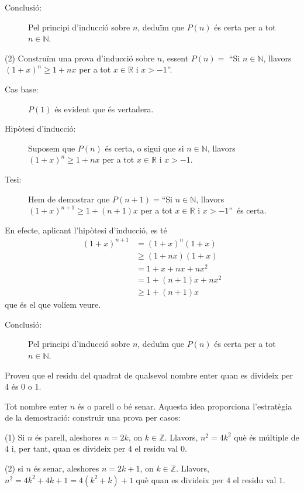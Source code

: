 \begin{solucio}
\begin{description}
\item[Conclusió:] Pel principi d'inducció sobre $n$, deduïm que
$P(n)$ és certa per a tot $n\in\mathbb{N}$.
\end{description}

(2) Construïm una prova d'inducció sobre $n$, essent $P(n)=$
\enquote{Si $n\in\mathbb{N}$, llavors $\left(  1+x\right)  ^{n}%
\geq1+nx$ per a tot $x\in\mathbb{R}$ i $x>-1$}.

\begin{description}
\item[Cas base:] $P(1)$ és evident que és vertadera.

\item[Hipòtesi d'inducció:] Suposem que $P(n)$ és certa, o sigui
que si $n\in\mathbb{N}$, llavors $\left(  1+x\right)  ^{n}\geq1+nx$ per a tot
$x\in\mathbb{R}$ i $x>-1$.

\item[Tesi:] Hem de demostrar que $P(n+1)=$\enquote{Si $n\in
\mathbb{N}$, llavors $\left(  1+x\right)  ^{n+1}\geq1+(n+1)x$ per a tot
$x\in\mathbb{R}$ i $x>-1$}\ és certa.
\end{description}

En efecte, aplicant l'hipòtesi d'inducció, es té%
\begin{align*}
\left(  1+x\right)  ^{n+1}  &  =(1+x)^{n}(1+x)\\
&  \geq\left(  1+nx\right)  (1+x)\\
&  =1+x+nx+nx^{2}\\
&  =1+(n+1)x+nx^{2}\\
&  \geq1+(n+1)x
\end{align*}
que és el que volíem veure.

\begin{description}
\item[Conclusió:] Pel principi d'inducció sobre $n$, deduïm que
$P(n)$ és certa per a tot $n\in\mathbb{N}$.
\end{description}
\end{solucio}

\begin{exercici}
Proveu que el residu del quadrat de qualsevol nombre enter quan es divideix
per 4 és $0$ o $1$.
\end{exercici}

\begin{solucio}
Tot nombre enter $n$ és o parell o bé senar. Aquesta idea proporciona
l'estratègia de la demostració: construïr una prova per casos:

(1) Si $n$ és parell, aleshores $n=2k$, on $k\in\mathbb{Z}$. Llavors,
$n^{2}=4k^{2}$ què és múltiple de $4$ i, per tant, quan es
divideix per $4$ el residu val $0$.

(2) si $n$ és senar, aleshores $n=2k+1$, on $k\in\mathbb{Z}$. Llavors,
$n^{2}=4k^{2}+4k+1=4\left(  k^{2}+k\right)  +1$ què quan es divideix per
$4$ el residu val $1$.
\end{solucio}

